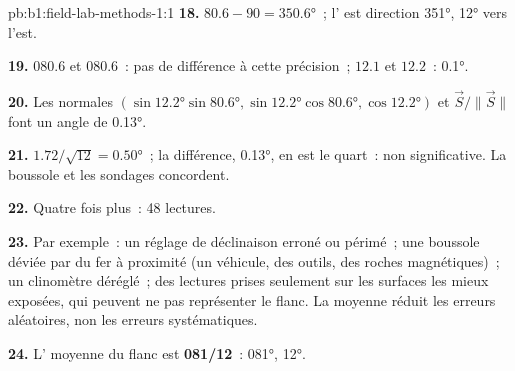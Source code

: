 \begin{solution}{pb:b1:field-lab-methods-1:1}
\textbf{18.} $80.6 - 90 = \ang{350.6}$~; l' est direction \ang{351},
 \ang{12} vers l'est.

\textbf{19.}  $080.6$ et $080.6$~: pas de différence à cette
précision~;  $12.1$ et $12.2$~: \ang{0.1}.

\textbf{20.} Les normales $(\sin\ang{12.2}\sin\ang{80.6},
\sin\ang{12.2}\cos\ang{80.6}, \cos\ang{12.2})$ et $\vec S/\|\vec S\|$ font
un angle de \ang{0.13}.

\textbf{21.} $1.72/\sqrt{12} = \ang{0.50}$~; la différence, \ang{0.13}, en est le
quart~: non significative. La boussole et les sondages concordent.

\textbf{22.} Quatre fois plus~: 48 lectures.

\textbf{23.} Par exemple~: un réglage de déclinaison erroné ou périmé~; une
boussole déviée par du fer à proximité (un véhicule, des outils, des roches
magnétiques)~; un clinomètre déréglé~; des lectures prises seulement sur les
surfaces les mieux exposées, qui peuvent ne pas représenter le flanc. La moyenne
réduit les erreurs aléatoires, non les erreurs systématiques.

\textbf{24.} L' moyenne du flanc est \textbf{081/12}~: 
\ang{081},  \ang{12}.
\end{solution}

